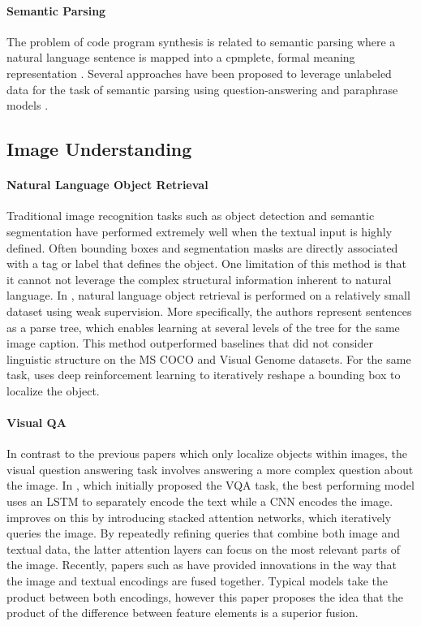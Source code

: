 \documentclass[11pt,a4paper]{article}
\begin{document}
\paragraph{Semantic Parsing} The problem of code program synthesis is related to semantic parsing where a natural language sentence is mapped into a cpmplete, formal meaning representation \citep{mooney2007learning}. Several approaches have been proposed to leverage unlabeled data for the task of semantic parsing using question-answering and paraphrase models
\citep{berant2013semantic, berant2014semantic} .

\subsection{Image Understanding}

\paragraph{Natural Language Object Retrieval}
Traditional image recognition tasks such as object detection and semantic segmentation have performed extremely well when the textual input is highly defined. Often bounding boxes and segmentation masks are directly associated with a tag or label that defines the object. One limitation of this method is that it cannot not leverage the complex structural information inherent to natural language. In \cite{vis_grounding}, natural language object retrieval is performed on a relatively small dataset using weak supervision. More specifically, the authors represent sentences as a parse tree, which enables learning at several levels of the tree for the same image caption. This method outperformed baselines that did not consider linguistic structure on the MS COCO and Visual Genome datasets. For the same task, \citep{end_to_end_approach} uses deep reinforcement learning to iteratively reshape a bounding box to localize the object. 

\paragraph{Visual QA} In contrast to the previous papers which only localize objects within images, the visual question answering task involves answering a more complex question about the image. In \citep{VQA}, which initially proposed the VQA task, the best performing model uses an LSTM to separately encode the text while a CNN encodes the image. \citep{stacked_attention} improves on this by introducing stacked attention networks, which iteratively queries the image. By repeatedly refining queries that combine both image and textual data, the latter attention layers can focus on the most relevant parts of the image. Recently, papers such as \cite{Wu_Liu_Wang_Li_2019} have provided innovations in the way that the image and textual encodings are fused together. Typical models take the product between both encodings, however this paper proposes the idea that the product of the difference between feature elements is a superior fusion.
\end{document}
